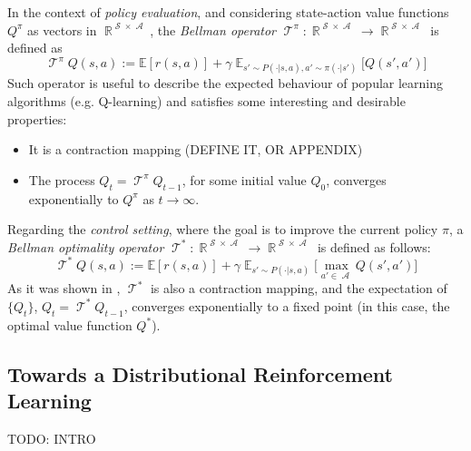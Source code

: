 \documentclass[12pt,a4paper,openright,twoside]{article}
\DeclareMathOperator*{\E}{\mathbb{E}}
\DeclareMathOperator*{\R}{\mathbb{R}}
\DeclareMathOperator*{\Sspace}{\mathcal{S}}
\DeclareMathOperator*{\A}{\mathcal{A}}
\DeclareMathOperator*{\T}{\mathcal{T}}
\numberwithin{equation}{section}
\theoremstyle{definition}
\theoremstyle{remark}
\theoremstyle{plain}
\begin{document}
In the context of \textit{policy evaluation}, and considering state-action value functions $Q^\pi$ as vectors in $\R^{\Sspace \times \A}$, the \textit{Bellman operator} $\T^{\pi} : \R^{\Sspace \times \A} \rightarrow \R^{\Sspace \times \A}$ is defined as
\begin{equation} \label{BellmanOp}
	{\T}^\pi Q(s,a) :=  \mathbb{E} \left[ r(s,a) \right] + \gamma \E_{s'\sim P(\cdot | s,a), a' \sim \pi(\cdot | s')} \bigg[Q(s',a') \bigg]
\end{equation}
Such operator is useful to describe the expected behaviour of popular learning algorithms (e.g. Q-learning) and satisfies some interesting and desirable properties\cite{rlformulation}:
\begin{itemize}
	\item It is a contraction mapping (DEFINE IT, OR APPENDIX)
	\item The process $Q_t = \T^\pi Q_{t-1}$, for some initial value $Q_0$, converges exponentially to $Q^\pi$ as $t \rightarrow \infty$.
\end{itemize}


Regarding the \textit{control setting}, where the goal is to improve the current policy $\pi$, a \textit{Bellman optimality operator} $\T^* : \R^{\Sspace \times \A} \rightarrow \R^{\Sspace \times \A}$ is defined as follows:
\begin{equation} \label{BellmanOptimalityOp}
	{\T}^* Q(s,a) :=  \mathbb{E} \left[ r(s,a) \right] + \gamma \E_{s'\sim P(\cdot | s,a)} \bigg[ \max_{a' \in \A}  Q(s',a') \bigg]
\end{equation}
As it was shown in \cite{rlformulation}, $\T^*$ is also a contraction mapping, and the expectation of $\{ Q_t \}$, $Q_t = \T^* Q_{t-1}$, converges exponentially to a fixed point (in this case, the optimal value function $Q^*$).

\subsection{Towards a Distributional Reinforcement Learning}

TODO: INTRO
\end{document}
